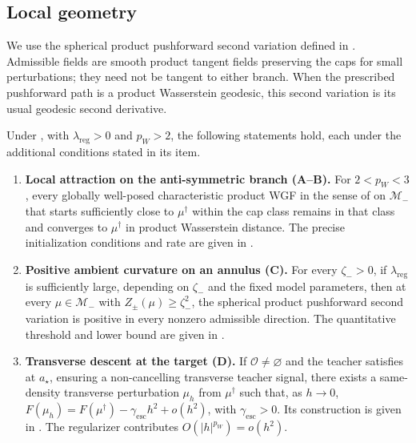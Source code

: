 \subsection{Local geometry}
\label{subsec:mf-curvature-pieces}

We use the spherical product pushforward second variation defined in
.
Admissible fields are smooth product tangent fields preserving the caps for
small perturbations; they need not be tangent to either branch. When the
prescribed pushforward path is a product Wasserstein geodesic, this second variation
is its usual geodesic second derivative.

\begin{proposition}
\label{prop:mf-local-geometry}
Under , with \(\lambda_{\mathrm{reg}}>0\) and \(p_W>2\), the following statements hold,
each under the additional conditions stated in its item.
\begin{enumerate}[label=(\roman*),ref=(\roman*),leftmargin=*]
\item \label{item:mf-local-attraction}
\textbf{Local attraction on the anti-symmetric branch (A--B).}
For \(2<p_W<3\), every globally well-posed characteristic product WGF in the sense of  on
\(\mathcal M_-\) that starts sufficiently close to \(\mu^\dagger\) within the
cap class remains in that class and converges to \(\mu^\dagger\) in product
Wasserstein distance.
The precise initialization conditions and rate are given in
.

\item \label{item:mf-annular-curvature}
\textbf{Positive ambient curvature on an annulus (C).}
For every \(\zeta_->0\), if \(\lambda_{\mathrm{reg}}\) is sufficiently large,
depending on \(\zeta_-\) and the fixed model parameters, then at every
\(\mu\in\mathcal M_-\) with \(Z_\pm(\mu)\ge\zeta_-^2\), the spherical product
pushforward second variation is positive in every nonzero admissible direction.
The quantitative threshold and lower bound are given in
.

\item \label{item:mf-transverse-descent}
\textbf{Transverse descent at the target (D).}
If \(\mathcal O\ne\varnothing\) and the teacher satisfies
at \(a_\star\), ensuring a non-cancelling transverse teacher signal,
there exists a same-density transverse perturbation \(\mu_h\) from
\(\mu^\dagger\) such that, as \(h\to0\),
\(F(\mu_h)=F(\mu^\dagger)-\gamma_{\mathrm{esc}}h^2+o(h^2)\),
with \(\gamma_{\mathrm{esc}}>0\).
Its construction is given in
.
The regularizer contributes \(O(|h|^{p_W})=o(h^2)\).


\end{enumerate}
\end{proposition}
